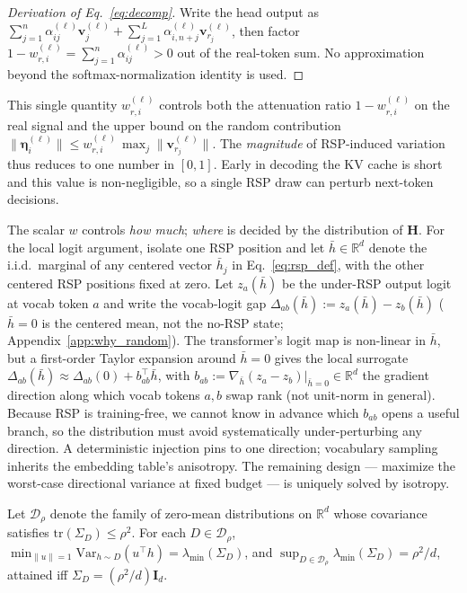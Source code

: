 \begin{proof}[Derivation of Eq.~\eqref{eq:decomp}]
Write the head output as $\sum_{j=1}^{n}\alpha_{ij}^{(\ell)}\mathbf{v}_{j}^{(\ell)}+\sum_{j=1}^{L}\alpha_{i,n+j}^{(\ell)}\mathbf{v}_{r_j}^{(\ell)}$, then factor $1-w_{r,i}^{(\ell)} = \sum_{j=1}^n \alpha_{ij}^{(\ell)}>0$ out of the real-token sum. No approximation beyond the softmax-normalization identity is used.
\end{proof}

This single quantity $w_{r,i}^{(\ell)}$ controls both the attenuation ratio $1-w_{r,i}^{(\ell)}$ on the real signal and the upper bound on the random contribution $\|\boldsymbol{\eta}_i^{(\ell)}\| \le w_{r,i}^{(\ell)}\,\max_j \|\mathbf{v}_{r_j}^{(\ell)}\|$. The \emph{magnitude} of RSP-induced variation thus reduces to one number in $[0,1]$. Early in decoding the KV cache is short and this value is non-negligible, so a single RSP draw can perturb next-token decisions.

The scalar $w$ controls \emph{how much}; \emph{where} is decided by the distribution of $\mathbf{H}$. For the local logit argument, isolate one RSP position and let $\bar h \in \mathbb{R}^d$ denote the i.i.d.\ marginal of any centered vector $\bar h_j$ in Eq.~\eqref{eq:rsp_def}, with the other centered RSP positions fixed at zero. Let $z_a(\bar h)$ be the under-RSP output logit at vocab token $a$ and write the vocab-logit gap $\Delta_{ab}(\bar h) := z_a(\bar h) - z_b(\bar h)$ ($\bar h = 0$ is the centered mean, not the no-RSP state; Appendix~\ref{app:why_random}). The transformer's logit map is non-linear in $\bar h$, but a first-order Taylor expansion around $\bar h = 0$ gives the local surrogate $\Delta_{ab}(\bar h) \approx \Delta_{ab}(0) + b_{ab}^\top \bar h$, with $b_{ab} := \nabla_{\bar h}(z_a - z_b)|_{\bar h=0} \in \mathbb{R}^d$ the gradient direction along which vocab tokens $a, b$ swap rank (not unit-norm in general). Because RSP is training-free, we cannot know in advance which $b_{ab}$ opens a useful branch, so the distribution must avoid systematically under-perturbing any direction. A deterministic injection pins to one direction; vocabulary sampling inherits the embedding table's anisotropy. The remaining design --- maximize the worst-case directional variance at fixed budget --- is uniquely solved by isotropy.

\begin{proposition}\label{thm:minimax_directional_coverage}
Let $\mathcal{D}_\rho$ denote the family of zero-mean distributions on $\mathbb{R}^d$ whose covariance satisfies $\mathrm{tr}(\Sigma_D)\le\rho^2$. For each $D \in \mathcal{D}_\rho$, $\min_{\|u\|=1}\mathrm{Var}_{h\sim D}(u^\top h) = \lambda_{\min}(\Sigma_D)$, and $\sup_{D \in \mathcal{D}_\rho} \lambda_{\min}(\Sigma_D) = \rho^2/d$, attained iff $\Sigma_D = (\rho^2/d)\mathbf{I}_d$.
\end{proposition}

